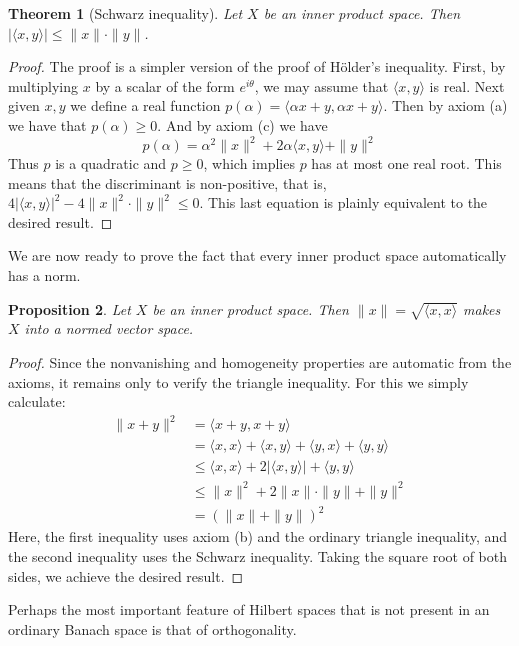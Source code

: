 \documentclass[11pt,oneside]{amsbook}
\theoremstyle{definition}
\theoremstyle{plain}
\newtheorem{thm}{Theorem}[section]
\newtheorem{prop}[thm]{Proposition}
\theoremstyle{definition}
\theoremstyle{remark}
\numberwithin{equation}{section}
\numberwithin{figure}{section}
\begin{document}
\begin{thm}[Schwarz inequality]
  Let $X$ be an inner product space. Then $|\langle x,y\rangle|\leq\|x\|\cdot\|y\|$.
\end{thm}

\begin{proof}
  The proof is a simpler version of the proof of H\"older's inequality. First, by multiplying $x$ by a scalar of the form $e^{i\theta}$, we may assume that $\langle x,y\rangle$ is real. Next given $x,y$ we define a real function $p(\alpha)=\langle\alpha x+y,\alpha x+y\rangle$. Then by axiom (a) we have that $p(\alpha)\geq0$. And by axiom (c) we have
  \[p(\alpha)=\alpha^2\|x\|^2+2\alpha\langle x,y\rangle+\|y\|^2
  \]
  Thus $p$ is a quadratic and $p\geq0$, which implies $p$ has at most one real root. This means that the discriminant is non-positive, that is, $4|\langle x,y\rangle|^2-4\|x\|^2\cdot\|y\|^2\leq0$. This last equation is plainly equivalent to the desired result.
\end{proof}

We are now ready to prove the fact that every inner product space automatically has a norm.

\begin{prop}
  Let $X$ be an inner product space. Then $\|x\|=\sqrt{\langle x,x\rangle}$ makes $X$ into a normed vector space.
\end{prop}

\begin{proof}
  Since the nonvanishing and homogeneity properties are automatic from the axioms, it remains only to verify the triangle inequality. For this we simply calculate:
  \begin{align*}
    \|x+y\|^2&=\langle x+y,x+y\rangle\\
             &=\langle x,x\rangle+\langle x,y\rangle+\langle y,x\rangle+\langle y,y\rangle\\
             &\leq \langle x,x\rangle+2|\langle x,y\rangle|+\langle y,y\rangle\\
             &\leq\|x\|^2+2\|x\|\cdot\|y\|+\|y\|^2\\
             &=(\|x\|+\|y\|)^2
  \end{align*}
  Here, the first inequality uses axiom (b) and the ordinary triangle inequality, and the second inequality uses the Schwarz inequality. Taking the square root of both sides, we achieve the desired result.
\end{proof}

Perhaps the most important feature of Hilbert spaces that is not present in an ordinary Banach space is that of orthogonality.
\end{document}
